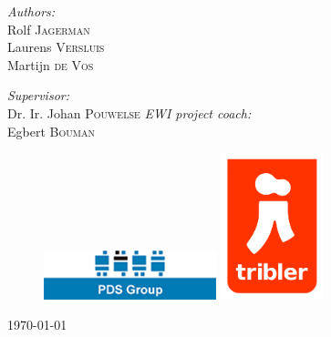 \begin{titlepage}
\begin{center}
\begin{minipage}{0.4\textwidth}
\begin{flushleft} \large
\emph{Authors:}\\
Rolf \textsc{Jagerman} \\ [0.1cm]
Laurens \textsc{Versluis} \\ [0.1cm]
Martijn \textsc{de Vos} \\ [0.1cm]
\end{flushleft}
\end{minipage}
\begin{minipage}{0.4\textwidth}
\begin{flushright} \large
\emph{Supervisor:} \\
Dr. Ir. Johan \textsc{Pouwelse}
\emph{EWI project coach:} \\
Egbert \textsc{Bouman}
\end{flushright}
\end{minipage}
\vspace{30mm}
\begin{figure}[ht!]
\centering
\includegraphics[width=50mm]{graphics/pdslogo.png}
\hspace{10mm}
\includegraphics[width=30mm]{graphics/triblerlogo.png}
\label{overflow}
\end{figure}
\vfill

{\large \today}

\end{center}

\end{titlepage}